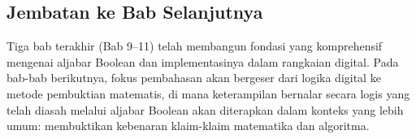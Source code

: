 \subsection{Jembatan ke Bab Selanjutnya}

Tiga bab terakhir (Bab 9--11) telah membangun fondasi yang komprehensif mengenai aljabar Boolean dan implementasinya dalam rangkaian digital. Pada bab-bab berikutnya, fokus pembahasan akan bergeser dari logika digital ke metode pembuktian matematis, di mana keterampilan bernalar secara logis yang telah diasah melalui aljabar Boolean akan diterapkan dalam konteks yang lebih umum: membuktikan kebenaran klaim-klaim matematika dan algoritma.
